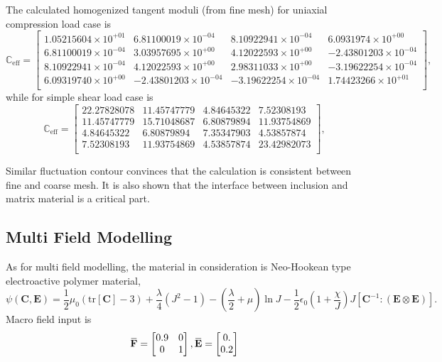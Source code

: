 \documentclass[10pt,a4paper]{scrreprt}
\newcommand{\overbar}[1]{\mkern 1.5mu\overline{\mkern-1.5mu#1\mkern-1.5mu}\mkern 1.5mu}
\begin{document}
The calculated homogenized tangent moduli (from fine mesh) for uniaxial compression load case is 
\begin{equation}
\mathbb{C}_{\text{eff}} = 
\begin{bmatrix}
1.05215604 \times 10^{+01} &  6.81100019\times 10^{-04}  & 8.10922941\times 10^{-04} & 6.0931974\times 10^{+00} \\
6.81100019\times 10^{-04} &  3.03957695\times 10^{+00} &  4.12022593\times 10^{+00} & -2.43801203\times 10^{-04}\\
8.10922941\times 10^{-04} &  4.12022593\times 10^{+00} &  2.98311033\times 10^{+00} & -3.19622254\times 10^{-04}\\
6.09319740\times 10^{+00} & -2.43801203\times 10^{-04} & -3.19622254\times 10^{-04} &  1.74423266\times 10^{+01}\\
\end{bmatrix},
\end{equation}
while for simple shear load case is 
\begin{equation}
\mathbb{C}_{\text{eff}} = 
\begin{bmatrix}
22.27828078 & 11.45747779 &  4.84645322 &  7.52308193 \\
11.45747779 & 15.71048687 &  6.80879894 & 11.93754869 \\
4.84645322 &  6.80879894  & 7.35347903 &  4.53857874 \\
7.52308193 & 11.93754869 &  4.53857874 & 23.42982073 \\
\end{bmatrix},
\end{equation}

Similar fluctuation contour convinces that the calculation is consistent between fine and coarse mesh. It is also shown that the interface between inclusion and matrix material is a critical part.

\subsection{Multi Field Modelling}
As for multi field modelling, the material in consideration is Neo-Hookean type electroactive polymer material, 
\begin{equation}
\label{eq: nhk}
\psi\left( \mathbf{C}, \mathbf{E} \right) =  \frac{1}{2}\mu_{0} \left( \text{tr}[\mathbf{C}]-3 \right) + \dfrac{\lambda}{4} \left( J^{2}-1 \right) - \left( \dfrac{\lambda}{2} + \mu \right) \ln J - \frac{1}{2} \epsilon_{0} \left( 1+\dfrac{\chi}{J} \right) J \left[ \mathbf{C}^{-1}: (\mathbf{E} \otimes \mathbf{E}) \right].
\end{equation}
Macro field input is 
\[
\overbar{\mathbf{F}} = 
\begin{bmatrix}
0.9 & 0 \\
0 & 1 \\
\end{bmatrix},
\overbar{\mathbf{E}} = 
\begin{bmatrix}
0. \\
0.2
\end{bmatrix}
\]
\end{document}
